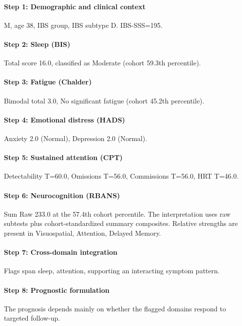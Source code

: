\documentclass[11pt,a4paper]{article}
\begin{document}
\paragraph{Step 1: Demographic and clinical context}
M, age 38, IBS group, IBS subtype D. IBS-SSS=195.

\paragraph{Step 2: Sleep (BIS)}
Total score 16.0, classified as Moderate (cohort 59.3th percentile).

\paragraph{Step 3: Fatigue (Chalder)}
Bimodal total 3.0, No significant fatigue (cohort 45.2th percentile).

\paragraph{Step 4: Emotional distress (HADS)}
Anxiety 2.0 (Normal), Depression 2.0 (Normal).

\paragraph{Step 5: Sustained attention (CPT)}
Detectability T=60.0, Omissions T=56.0, Commissions T=56.0, HRT T=46.0.

\paragraph{Step 6: Neurocognition (RBANS)}
Sum Raw 233.0 at the 57.4th cohort percentile. The interpretation uses raw subtests plus cohort-standardized summary composites. Relative strengths are present in Visuospatial, Attention, Delayed Memory.

\paragraph{Step 7: Cross-domain integration}
Flags span sleep, attention, supporting an interacting symptom pattern.

\paragraph{Step 8: Prognostic formulation}
The prognosis depends mainly on whether the flagged domains respond to targeted follow-up.
\end{document}
